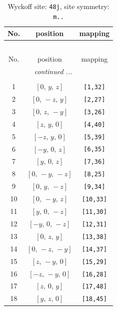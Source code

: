 \documentclass[fleqn,8pt]{jsarticle}
\begin{document}
\begin{longtable}{ccc}
\caption{Wyckoff site: {\tt 48j}, site symmetry: {\tt m..}}
 \\
 \hline \hline
No. & position & mapping \\ \hline \endfirsthead

\multicolumn{2}{l}{\tablename\ \thetable{}} \\
 \hline \hline
No. & position & mapping \\ \hline \endhead

 \hline \hline
\multicolumn{2}{r}{\footnotesize\it continued ...} \\ \endfoot

 \hline \hline
\multicolumn{2}{r}{} \\ \endlastfoot

1 & $\left[ 0,\, y,\, z \right]$ & {\tt [1,32]} \\ \hline
2 & $\left[ 0,\, - z,\, y \right]$ & {\tt [2,27]} \\ \hline
3 & $\left[ 0,\, z,\, - y \right]$ & {\tt [3,26]} \\ \hline
4 & $\left[ z,\, y,\, 0 \right]$ & {\tt [4,40]} \\ \hline
5 & $\left[ - z,\, y,\, 0 \right]$ & {\tt [5,39]} \\ \hline
6 & $\left[ - y,\, 0,\, z \right]$ & {\tt [6,35]} \\ \hline
7 & $\left[ y,\, 0,\, z \right]$ & {\tt [7,36]} \\ \hline
8 & $\left[ 0,\, - y,\, - z \right]$ & {\tt [8,25]} \\ \hline
9 & $\left[ 0,\, y,\, - z \right]$ & {\tt [9,34]} \\ \hline
10 & $\left[ 0,\, - y,\, z \right]$ & {\tt [10,33]} \\ \hline
11 & $\left[ y,\, 0,\, - z \right]$ & {\tt [11,30]} \\ \hline
12 & $\left[ - y,\, 0,\, - z \right]$ & {\tt [12,31]} \\ \hline
13 & $\left[ 0,\, z,\, y \right]$ & {\tt [13,38]} \\ \hline
14 & $\left[ 0,\, - z,\, - y \right]$ & {\tt [14,37]} \\ \hline
15 & $\left[ z,\, - y,\, 0 \right]$ & {\tt [15,29]} \\ \hline
16 & $\left[ - z,\, - y,\, 0 \right]$ & {\tt [16,28]} \\ \hline
17 & $\left[ z,\, 0,\, y \right]$ & {\tt [17,48]} \\ \hline
18 & $\left[ y,\, z,\, 0 \right]$ & {\tt [18,45]} \\ \hline

\end{longtable}
\end{document}
